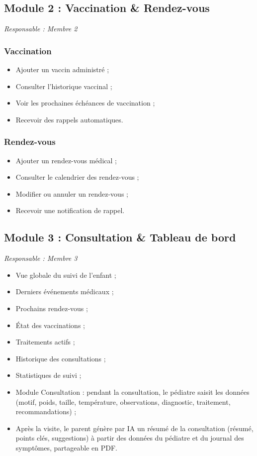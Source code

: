\documentclass[11pt,a4paper]{article}
\begin{document}
\subsection{Module 2 : Vaccination \& Rendez-vous}

\textit{Responsable : Membre 2}

\subsubsection{Vaccination}
\begin{itemize}
  \item Ajouter un vaccin administré ;
  \item Consulter l'historique vaccinal ;
  \item Voir les prochaines échéances de vaccination ;
  \item Recevoir des rappels automatiques.
\end{itemize}

\subsubsection{Rendez-vous}
\begin{itemize}
  \item Ajouter un rendez-vous médical ;
  \item Consulter le calendrier des rendez-vous ;
  \item Modifier ou annuler un rendez-vous ;
  \item Recevoir une notification de rappel.
\end{itemize}

\subsection{Module 3 : Consultation \& Tableau de bord}

\textit{Responsable : Membre 3}

\begin{itemize}
  \item Vue globale du suivi de l'enfant ;
  \item Derniers événements médicaux ;
  \item Prochains rendez-vous ;
  \item État des vaccinations ;
  \item Traitements actifs ;
  \item Historique des consultations ;
  \item Statistiques de suivi ;
  \item Module Consultation : pendant la consultation, le pédiatre saisit les données (motif, poids, taille, température, observations, diagnostic, traitement, recommandations) ;
  \item Après la visite, le parent génère par IA un résumé de la consultation (résumé, points clés, suggestions) à partir des données du pédiatre et du journal des symptômes, partageable en PDF.
\end{itemize}
\end{document}

